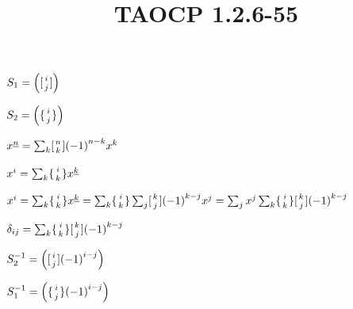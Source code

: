 \documentclass{article}
\title{TAOCP 1.2.6\mbox{-}55}
\begin{document}
\maketitle

\( S_{1} = \left([{i \atop j}]\right) \)

\( S_{2} = \left(\{{i \atop j}\}\right) \)

\( x^{\underline{n}} = \sum_{k} [{n \atop k}]{(-1)}^{n-k}x^{k} \)

\( x^{i} = \sum_{k} \{{i \atop k}\}x^{\underline{k}} \)

\( x^{i} = \sum_{k} \{{i \atop k}\}x^{\underline{k}} = \sum_{k} \{{i \atop k}\}\sum_{j} [{k \atop j}]{(-1)}^{k-j}x^{j} = \sum_{j} x^{j} \sum_{k} \{{i \atop k}\}[{k \atop j}]{(-1)}^{k-j} \)

\( \delta_{ij} = \sum_{k} \{{i \atop k}\}[{k \atop j}]{(-1)}^{k-j} \)

\( S_{2}^{-1} = \left([{i \atop j}]{(-1)}^{i-j}\right) \)

\( S_{1}^{-1} = \left(\{{i \atop j}\}{(-1)}^{i-j}\right) \)
\end{document}

